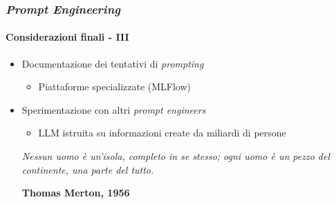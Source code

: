 \begin{frame}[t] \frametitle{\emph{Prompt Engineering}}
\framesubtitle{Considerazioni finali - III}
{\footnotesize
    \begin{minipage}[t]{\textwidth}
        \begin{itemize}[leftmargin=10pt,align=right]
            \item[\alert{\faArrowCircleRight}] \alert{Documentazione dei tentativi di \textit{prompting}}
            \begin{itemize}[leftmargin=10pt,align=right]
                \item[\alert{\alert{\faArrowCircleRight}}] Piattaforme specializzate (MLFlow)
            \end{itemize}
            \item[\alert{\faArrowCircleRight}] \alert{Sperimentazione con altri \textit{prompt engineers}}
            \begin{itemize}[leftmargin=10pt,align=right]
                \item[\alert{\alert{\faArrowCircleRight}}] LLM istruita su informazioni create da miliardi di persone
            \end{itemize}
            \hfill
            \begin{minipage}[t]{.5\textwidth}
			    \renewcommand{\epigraphsize}{\scriptsize}
			    \setlength{\afterepigraphskip}{5pt}
			    \setlength{\beforeepigraphskip}{5pt}
			    \setlength{\epigraphwidth}{\textwidth}
			    \epigraph{\textit{Nessun uomo è un’isola, completo in se stesso; ogni uomo è un pezzo del continente, una parte del tutto.}}{\textbf{Thomas Merton, 1956}}
            \end{minipage}
        \end{itemize}
    \end{minipage}
}
\end{frame}